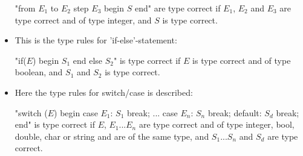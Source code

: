 \begin{itemize}
"from $E_1$ to $E_2$ step $E_3$ begin $S$ end" are type correct if $E_1$, $E_2$ and $E_3$ are type correct and of type integer, and $S$ is type correct.

\item This is the type rules for 'if-else'-statement:

"if($E$) begin $S_1$ end else $S_2$" is type correct if $E$ is type correct and of type boolean, and $S_1$ and $S_2$ is type correct.

\item Here the type rules for switch/case is described:

"switch ($E$) begin case $E_1$: $S_1$ break; ... case $E_n$: $S_n$ break; default: $S_d$ break; end" is type correct if $E$, $E_1$...$E_n$ are type correct and of type integer, bool, double, char or string and are of the same type, and $S_1$...$S_n$ and $S_d$ are type correct.
\end{itemize}